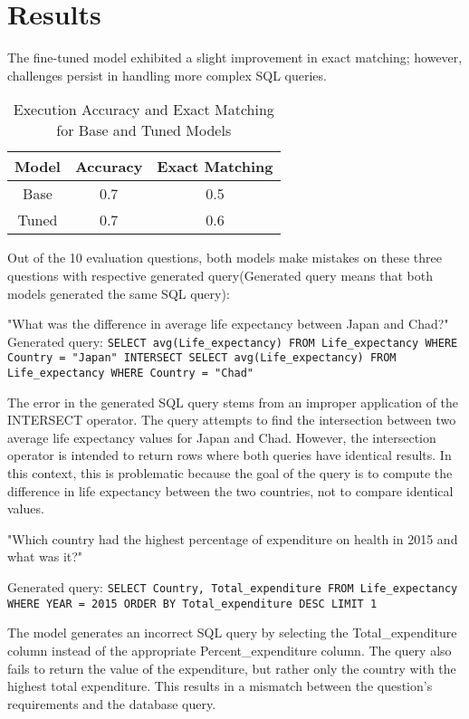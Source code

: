 \documentclass[11pt]{article}
\begin{document}
\section{Results}

The fine-tuned model exhibited a slight improvement in exact matching; however, challenges persist in handling more complex SQL queries.

\begin{table}[h!]
\centering
\begin{tabular}{|c|c|c|}
\hline
\textbf{Model} & \textbf{Accuracy} & \textbf{Exact Matching} \\ \hline
Base           & 0.7                    & 0.5                       \\ \hline
Tuned          & 0.7                    & 0.6                       \\ \hline
\end{tabular}
\caption{Execution Accuracy and Exact Matching for Base and Tuned Models}
\label{tab:accuracy_em}
\end{table}

Out of the 10 evaluation questions, both models make mistakes on these three questions with respective generated query(Generated query means that both models generated the same SQL query):

"What was the difference in average life expectancy between Japan and Chad?"
Generated query: \texttt{SELECT avg(Life\_expectancy) FROM Life\_expectancy WHERE Country = "Japan" INTERSECT SELECT avg(Life\_expectancy) FROM Life\_expectancy WHERE Country = "Chad"}

The error in the generated SQL query stems from an improper application of the INTERSECT operator. The query attempts to find the intersection between two average life expectancy values for Japan and Chad. However, the intersection operator is intended to return rows where both queries have identical results. In this context, this is problematic because the goal of the query is to compute the difference in life expectancy between the two countries, not to compare identical values. 

"Which country had the highest percentage of expenditure on health in 2015 and what was it?"

Generated query: \texttt{SELECT Country, Total\_expenditure FROM Life\_expectancy WHERE YEAR = 2015 ORDER BY Total\_expenditure DESC LIMIT 1}

The model generates an incorrect SQL query by selecting the Total\_expenditure column instead of the appropriate Percent\_expenditure column. The query also fails to return the value of the expenditure, but rather only the country with the highest total expenditure. This results in a mismatch between the question's requirements and the database query.
\end{document}
